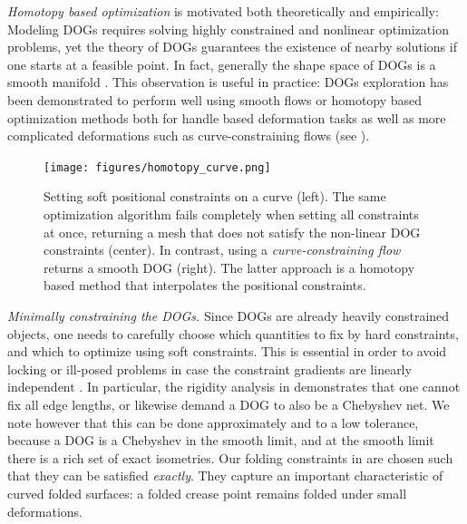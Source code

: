 \emph{Homotopy based optimization} is motivated both theoretically and empirically: Modeling DOGs requires solving highly constrained and nonlinear optimization problems, yet the theory of DOGs guarantees the existence of nearby solutions if one starts at a feasible point. In fact, generally the shape space of DOGs is a smooth manifold \cite{rabi2018shape}. This observation is useful in practice: DOGs exploration has been demonstrated to perform well using smooth flows or homotopy based optimization methods both for handle based deformation tasks as well as  more complicated deformations such as curve-constraining flows \cite{rabi2018shape} (see ).

\begin{figure} [t]
	\centering
	\texttt{[image: figures/homotopy\_curve.png]}
	\caption{Setting soft positional constraints on a curve (left). The same optimization algorithm fails completely when setting all constraints at once, returning a mesh that does not satisfy the non-linear DOG constraints (center). In contrast, using a \emph{curve-constraining flow} \cite{rabi2018shape} returns a smooth DOG (right). The latter approach is a homotopy based method that interpolates the positional constraints.} 
	\label{fig:homotopy_curve}
\end{figure}

\emph{Minimally constraining the DOGs.} Since DOGs are already heavily constrained objects, one needs to carefully choose which quantities to fix by hard constraints, and which to optimize using soft constraints. This is essential in order to avoid locking or ill-posed problems in case the constraint gradients are linearly independent \cite{rabi2018shape}. In particular, the rigidity analysis in \cite{rabi18} demonstrates that one cannot fix all edge lengths, or likewise demand a DOG to also be a Chebyshev net. We note however that this can be done approximately and to a low tolerance, because a DOG is a Chebyshev in the smooth limit, and at the smooth limit there is a rich set of exact isometries. Our folding constraints in  are chosen such that they can be satisfied \emph{exactly}. They capture an important characteristic of curved folded surfaces: a folded crease point remains folded under small deformations.
